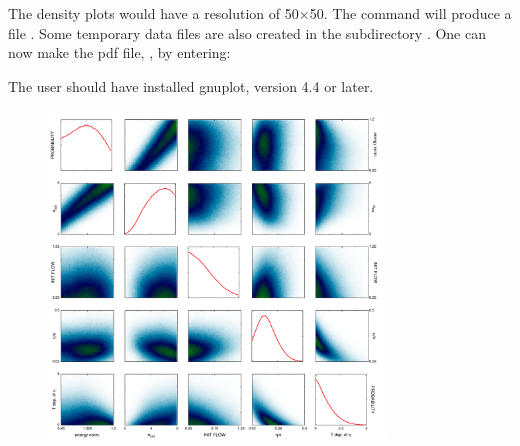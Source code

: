 
The density plots would have a resolution of 50$\times$50. The command will produce a file . Some temporary data files are also created in the subdirectory . One can now make the pdf file, , by entering:


The user should have installed gnuplot, version 4.4 or later. 

\begin{figure}
\includegraphics[width=0.8\textwidth]{figs/rhic.pdf}
\end{figure}
